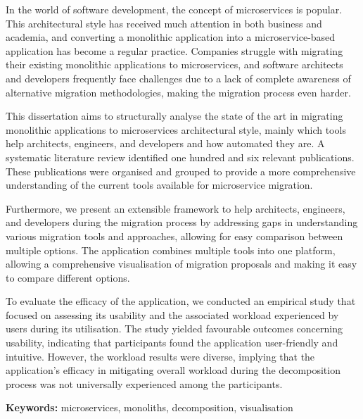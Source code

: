 In the world of software development, the concept of microservices is popular.
This architectural style has received much attention in both business and
academia, and converting a monolithic application into a microservice-based
application has become a regular practice. Companies struggle with migrating
their existing monolithic applications to microservices, and software
architects and developers frequently face challenges due to a lack of complete
awareness of alternative migration methodologies, making the migration process
even harder.

This dissertation aims to structurally analyse the state of the art in
migrating monolithic applications to microservices architectural style, mainly
which tools help architects, engineers, and developers and how automated they
are. A systematic literature review identified one hundred and six relevant
publications. These publications were organised and grouped to provide a more
comprehensive understanding of the current tools available for microservice
migration.

Furthermore, we present an extensible framework to help architects, engineers,
and developers during the migration process by addressing gaps in understanding
various migration tools and approaches, allowing for easy comparison between
multiple options. The application combines multiple tools into one platform,
allowing a comprehensive visualisation of migration proposals and making it
easy to compare different options.

To evaluate the efficacy of the application, we conducted an empirical study
that focused on assessing its usability and the associated workload experienced
by users during its utilisation. The study yielded favourable outcomes
concerning usability, indicating that participants found the application
user-friendly and intuitive. However, the workload results were diverse,
implying that the application's efficacy in mitigating overall workload during
the decomposition process was not universally experienced among the
participants.

\textbf{Keywords:} microservices, monoliths, decomposition, visualisation
